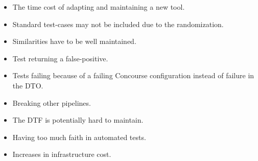 \begin{itemize}
    \item The time cost of adapting and maintaining a new tool.
    \item Standard test-cases may not be included due to the randomization.
    \item Similarities have to be well maintained.
    \item Test returning a false-positive.
    \item Tests failing because of a failing Concourse configuration instead of failure in the DTO.
    \item Breaking other pipelines.
    \item The DTF is potentially hard to maintain.
    \item Having too much faith in automated tests.
    \item Increases in infrastructure cost.
\end{itemize}